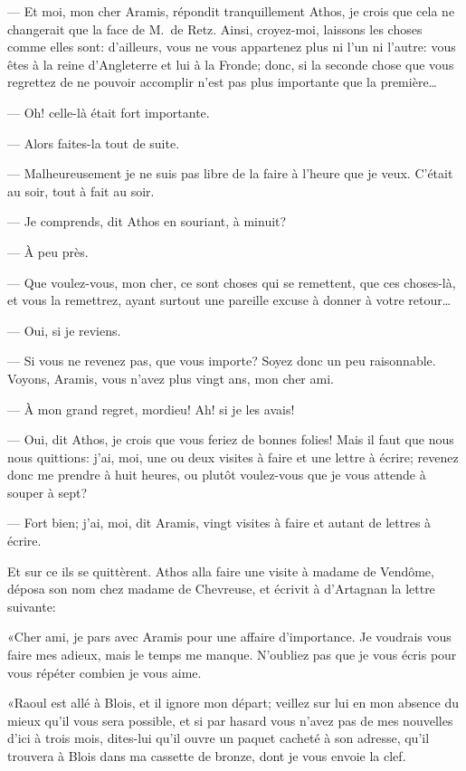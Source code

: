 — Et moi, mon cher Aramis, répondit tranquillement Athos, je crois que cela ne changerait que la face de M.~de Retz. Ainsi, croyez-moi, laissons les choses comme elles sont: d'ailleurs, vous ne vous appartenez plus ni l'un ni l'autre: vous êtes à la reine d'Angleterre et lui à la Fronde; donc, si la seconde chose que vous regrettez de ne pouvoir accomplir n'est pas plus importante que la première\dots

— Oh! celle-là était fort importante.

— Alors faites-la tout de suite.

— Malheureusement je ne suis pas libre de la faire à l'heure que je veux. C'était au soir, tout à fait au soir.

— Je comprends, dit Athos en souriant, à minuit?

— À peu près.

— Que voulez-vous, mon cher, ce sont choses qui se remettent, que ces choses-là, et vous la remettrez, ayant surtout une pareille excuse à donner à votre retour\dots

— Oui, si je reviens.

— Si vous ne revenez pas, que vous importe? Soyez donc un peu raisonnable. Voyons, Aramis, vous n'avez plus vingt ans, mon cher ami.

— À mon grand regret, mordieu! Ah! si je les avais!

— Oui, dit Athos, je crois que vous feriez de bonnes folies! Mais il faut que nous nous quittions: j'ai, moi, une ou deux visites à faire et une lettre à écrire; revenez donc me prendre à huit heures, ou plutôt voulez-vous que je vous attende à souper à sept?

— Fort bien; j'ai, moi, dit Aramis, vingt visites à faire et autant de lettres à écrire.

Et sur ce ils se quittèrent. Athos alla faire une visite à madame de Vendôme, déposa son nom chez madame de Chevreuse, et écrivit à d'Artagnan la lettre suivante:

«Cher ami, je pars avec Aramis pour une affaire d'importance. Je voudrais vous faire mes adieux, mais le temps me manque. N'oubliez pas que je vous écris pour vous répéter combien je vous aime.

«Raoul est allé à Blois, et il ignore mon départ; veillez sur lui en mon absence du mieux qu'il vous sera possible, et si par hasard vous n'avez pas de mes nouvelles d'ici à trois mois, dites-lui qu'il ouvre un paquet cacheté à son adresse, qu'il trouvera à Blois dans ma cassette de bronze, dont je vous envoie la clef.

